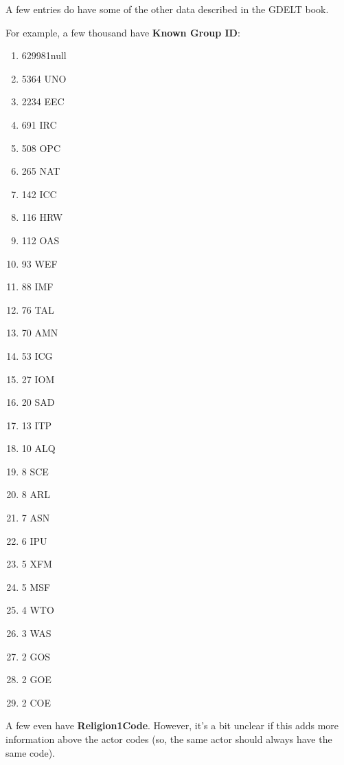 A few entries do have some of the other data described in the GDELT book.%

For example, a few thousand have \textbf{Known Group ID}:

 \begin{enumerate} 
 \item 629981\quad null
\item   5364 \quad UNO
\item   2234 \quad EEC
\item    691 \quad IRC
\item    508 \quad OPC
\item    265 \quad NAT
\item    142 \quad ICC
\item    116 \quad HRW
\item    112 \quad OAS
\item     93 \quad WEF
\item     88 \quad IMF
\item     76 \quad TAL
\item     70 \quad AMN
\item     53 \quad ICG
\item     27 \quad IOM
\item     20 \quad SAD
\item     13 \quad ITP
\item     10 \quad ALQ
\item       8 \quad SCE
\item      8 \quad ARL
\item      7 \quad ASN
\item      6 \quad IPU
\item      5 \quad XFM
\item      5 \quad MSF
\item      4 \quad WTO
\item      3 \quad WAS
\item      2 \quad GOS
\item      2 \quad GOE
\item      2 \quad COE \end{enumerate}

A few even have \textbf{Religion1Code}. %
However, it’s a bit unclear if this adds more information above the actor codes (so, the same actor should always have the same code).








